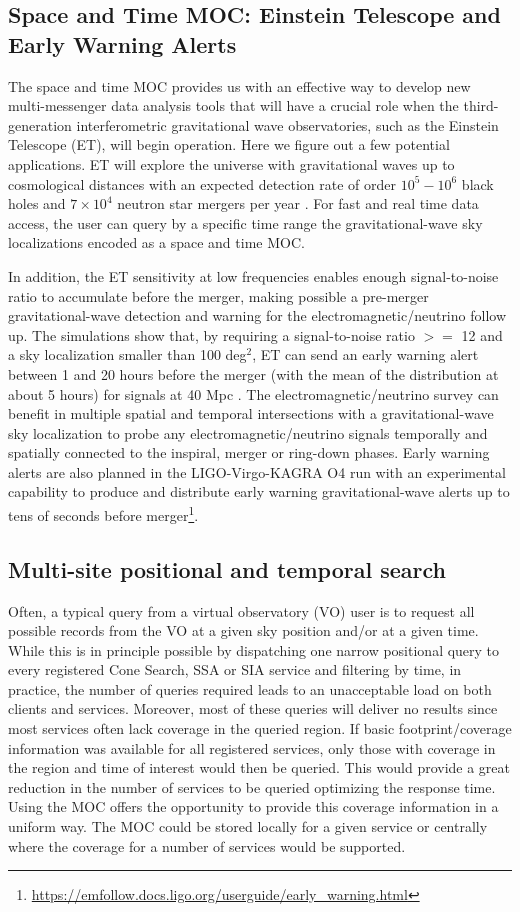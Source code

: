 \documentclass[11pt,a4paper]{ivoa}
\begin{document}
\subsection{Space and Time MOC: Einstein Telescope and Early Warning Alerts}
The space and time MOC provides us with an effective way to develop new
multi-messenger data analysis tools that will have a crucial role when
the third-generation interferometric gravitational wave observatories,
such as the Einstein Telescope (ET), will begin operation. Here we
figure out a few potential applications. ET will explore the universe
with gravitational waves up to cosmological distances with an
expected detection rate of order $10^{5} - 10^{6}$ black holes and $7\times10^4$
neutron star mergers per year \citep{2020JCAP...03..050M}.
For fast and real time data access, the user can query by a specific
time range the gravitational-wave sky localizations encoded as a space
and time MOC. 

In addition, the ET sensitivity at low frequencies enables enough
signal-to-noise ratio to accumulate before the merger, making possible
a pre-merger gravitational-wave detection and warning for the
electromagnetic/neutrino follow up.  The simulations show that, by
requiring a signal-to-noise ratio $>=$ 12 and a sky localization smaller
than 100 deg$^2$, ET can send an early warning alert between 1 and 20 hours
before the merger (with the mean of the distribution at about 5 hours)
for signals at 40 Mpc \citep{2018PhRvD..97l3014C}. The
electromagnetic/neutrino survey can benefit
in multiple spatial and temporal intersections with a gravitational-wave
sky localization to probe any electromagnetic/neutrino signals temporally
and spatially connected to the inspiral, merger or ring-down phases.
Early warning alerts are also planned in the LIGO-Virgo-KAGRA O4 run with
an experimental capability to produce and distribute early warning
gravitational-wave alerts up to tens of seconds before
merger\footnote{\url{https://emfollow.docs.ligo.org/userguide/early_warning.html}}.  


\subsection{Multi-site positional and temporal search}
Often, a typical query from a virtual observatory (VO) user is to
request all possible records from the VO at a given sky position
and/or at a given time. While this is in principle possible by
dispatching one narrow positional query to every registered Cone
Search, SSA or SIA service and filtering by time, in practice, the
number of queries required leads to an unacceptable load on both
clients and services. Moreover, most of these queries will deliver no
results since most services often lack coverage in the queried
region. If basic footprint/coverage information was available for all
registered services, only those with coverage in the region and time
of interest would then be queried. This would provide a great
reduction in the number of services to be queried optimizing the
response time. Using the MOC offers the opportunity to provide this
coverage information in a uniform way. The MOC could be stored locally
for a given service or centrally where the coverage for a number of
services would be supported.
\end{document}
